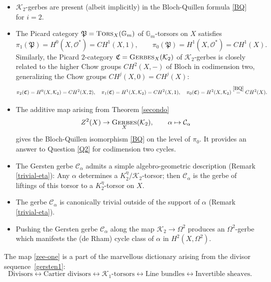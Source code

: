 \documentclass{amsart}
\numberwithin{equation}{subsection}
\theoremstyle{remark}
\theoremstyle{remark}
\newcommand{\cC}{\mathcal{C}}
\newcommand{\cK}{\mathcal{K}}
\newcommand{\cO}{\mathcal{O}}
\newcommand{\bbG}{\mathbb{G}}
\DeclareMathOperator{\ger}{\textsc{Gerbes}} %
\DeclareMathOperator{\tors}{\textsc{Tors}} %
\begin{document}
\begin{itemize}
\item $\cK_2$-gerbes are present (albeit implicitly) in the Bloch-Quillen formula \eqref{BQ} for $i=2$. 

\item The  Picard category $\mathfrak P =\tors_X(\bbG_m)$ of $\bbG_m$-torsors on $X$ satisfies
  \begin{equation*}
    \pi_1(\mathfrak P) = H^0(X, \cO^*) = CH^1(X, 1), \qquad \pi_0(\mathfrak P) = H^1(X, \cO^*)= CH^1(X).
  \end{equation*}
  Similarly, the Picard $2$-category $\mathfrak C = \ger_X (\cK_2)$ of $\cK_2$-gerbes is closely related to the higher Chow groups $CH^2(X, -)$ of Bloch \cite{Bloch2} in codimension two, generalizing the Chow groups $CH^j(X,0) = CH^j(X)$: 
  \begin{equation*}
    \pi_2(\mathfrak C) = H^0(X, \cK_2)= CH^2(X,2) ,\quad \pi_1(\mathfrak C) = H^1(X, \cK_2) = CH^2(X, 1), \quad \pi_0(\mathfrak C) = H^2(X, \cK_2) \overset{\eqref{BQ}}{=} CH^2(X).
  \end{equation*}

\item The additive map arising from Theorem \ref{secondo}
  \begin{equation*}
    Z^2(X) \to \ger_X(\cK_2), \qquad \alpha \mapsto \cC_{\alpha}
  \end{equation*}
  gives the Bloch-Quillen isomorphism \eqref{BQ} on the level of $\pi_0$. It provides an answer to Question \ref{Q2} for codimension two cycles.

\item The Gersten gerbe $\cC_{\alpha}$ admits a simple algebro-geometric description (Remark \ref{trivial-eta}): 
Any $\alpha$ determines a $K_2^{\eta}/{\cK_2}$-torsor; then $\cC_{\alpha}$ is the gerbe of liftings of this torsor  to a $K_2^{\eta}$-torsor on $X$.

\item The gerbe $\cC_{\alpha}$ is canonically trivial outside of the support of $\alpha$ (Remark \ref{trivial-eta}).
\item Pushing the Gersten gerbe $\cC_{\alpha}$ along the map $\cK_2 \to \Omega^2$ produces an $\Omega^2$-gerbe which manifests the (de Rham) cycle class of $\alpha$ in $H^2(X, \Omega^2)$.  
\end{itemize}
The map \eqref{zee-one} is a part of the marvellous dictionary  \cite[II,
\S6]{Hartshorne} arising from the divisor sequence~\eqref{gersten1}:
\begin{equation}\label{diction}
  \text{Divisors}\longleftrightarrow  \text{Cartier~divisors}
  \longleftrightarrow   \text{$\cK_1$-torsors}  \longleftrightarrow  \text{Line~bundles} \longleftrightarrow   \text{Invertible~sheaves}.
\end{equation}
\end{document}
